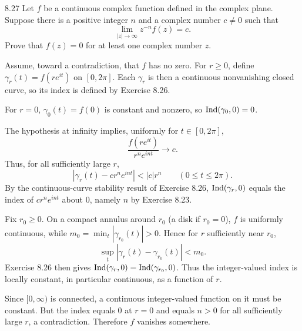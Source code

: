\documentclass[11pt, oneside]{article}
\begin{document}
\begin{exercise}{8.27}
Let $f$ be a continuous complex function defined in the complex plane. Suppose there is a positive integer $n$ and a complex number $c\ne0$ such that
\[
 \lim_{|z|\to\infty}z^{-n}f(z)=c.
\]
Prove that $f(z)=0$ for at least one complex number $z$.

\end{exercise}
\begin{solution}
Assume, toward a contradiction, that $f$ has no zero. For $r\ge0$, define $\gamma_r(t)=f(re^{it})$ on $[0, 2\pi]$. Each $\gamma_r$ is then a continuous nonvanishing closed curve, so its index is defined by Exercise 8.26.

For $r=0$, $\gamma_0(t)=f(0)$ is constant and nonzero, so $\operatorname{Ind}(\gamma_0, 0)=0$.

The hypothesis at infinity implies, uniformly for $t\in[0, 2\pi]$,
\[
 \frac{f(re^{it})}{r^ne^{int}}\longrightarrow c.
\]
Thus, for all sufficiently large $r$,
\[
 |\gamma_r(t)-cr^ne^{int}|<|c|r^n
 \qquad(0\le t\le2\pi).
\]
By the continuous-curve stability result of Exercise 8.26, $\operatorname{Ind}(\gamma_r, 0)$ equals the index of $cr^ne^{int}$ about $0$, namely $n$ by Exercise 8.23.

Fix $r_0\ge0$. On a compact annulus around $r_0$ (a disk if $r_0=0$), $f$ is uniformly continuous, while $m_0=\min_t|\gamma_{r_0}(t)|>0$. Hence for $r$ sufficiently near $r_0$,
\[
 \sup_t|\gamma_r(t)-\gamma_{r_0}(t)|<m_0.
\]
Exercise 8.26 then gives $\operatorname{Ind}(\gamma_r, 0)=\operatorname{Ind}(\gamma_{r_0}, 0)$. Thus the integer-valued index is locally constant, in particular continuous, as a function of $r$.

Since $[0, \infty)$ is connected, a continuous integer-valued function on it must be constant. But the index equals $0$ at $r=0$ and equals $n>0$ for all sufficiently large $r$, a contradiction. Therefore $f$ vanishes somewhere.
\end{solution}
\end{document}
